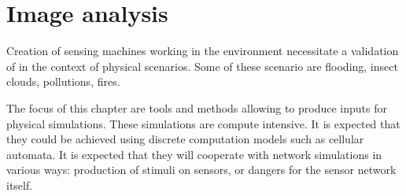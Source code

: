 
\chapter{Image analysis} 
 
Creation of sensing machines working in the environment necessitate 
a validation of in the context of physical scenarios. Some of these 
scenario are flooding, insect clouds, pollutions, fires.

The focus of this chapter are tools and methods allowing to produce inputs
for physical  simulations. These simulations are compute intensive. It is expected
that they could be achieved using discrete computation models such as
cellular automata. It is expected that they will cooperate with network simulations
in various ways: production of stimuli on sensors, or dangers for the sensor network
itself.

